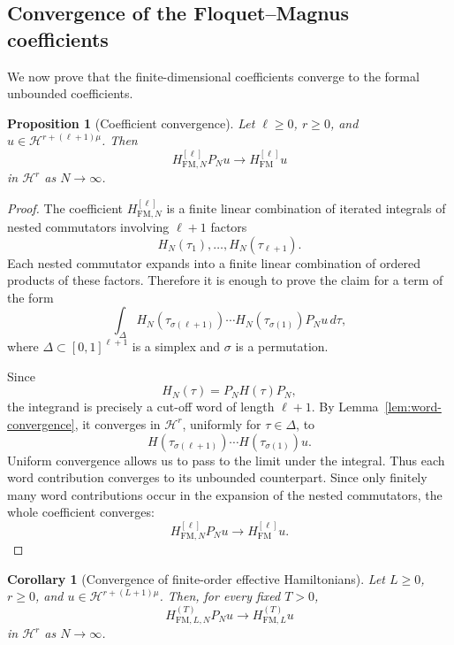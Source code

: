 \documentclass[11pt]{amsart}
\theoremstyle{plain}
\newtheorem{proposition}[theorem]{Proposition}
\newtheorem{corollary}[theorem]{Corollary}
\theoremstyle{definition}
\theoremstyle{remark}
\newcommand{\Hilb}{\mathcal H}
\begin{document}
\subsection{Convergence of the Floquet--Magnus coefficients}

We now prove that the finite-dimensional coefficients converge to the
formal unbounded coefficients.

\begin{proposition}[Coefficient convergence]
\label{prop:FM-coefficient-convergence}
Let \(\ell\geq0\), \(r\geq0\), and
\(u\in\Hilb^{r+(\ell+1)\mu}\).  Then
\[
        H_{\mathrm{FM},N}^{[\ell]}P_Nu
        \longrightarrow
        H_{\mathrm{FM}}^{[\ell]}u
\]
in \(\Hilb^r\) as \(N\to\infty\).
\end{proposition}

\begin{proof}
The coefficient \(H_{\mathrm{FM},N}^{[\ell]}\) is a finite linear
combination of iterated integrals of nested commutators involving
\(\ell+1\) factors
\[
        H_N(\tau_1),\ldots,H_N(\tau_{\ell+1}).
\]
Each nested commutator expands into a finite linear combination of
ordered products of these factors.  Therefore it is enough to prove the
claim for a term of the form
\[
        \int_{\Delta}
        H_N(\tau_{\sigma(\ell+1)})
        \cdots
        H_N(\tau_{\sigma(1)})
        P_Nu
        \,d\tau,
\]
where \(\Delta\subset[0,1]^{\ell+1}\) is a simplex and
\(\sigma\) is a permutation.

Since
\[
        H_N(\tau)=P_NH(\tau)P_N,
\]
the integrand is precisely a cut-off word of length \(\ell+1\).  By
Lemma~\ref{lem:word-convergence}, it converges in \(\Hilb^r\),
uniformly for \(\tau\in\Delta\), to
\[
        H(\tau_{\sigma(\ell+1)})
        \cdots
        H(\tau_{\sigma(1)})u.
\]
Uniform convergence allows us to pass to the limit under the integral.
Thus each word contribution converges to its unbounded counterpart.
Since only finitely many word contributions occur in the expansion of
the nested commutators, the whole coefficient converges:
\[
        H_{\mathrm{FM},N}^{[\ell]}P_Nu
        \longrightarrow
        H_{\mathrm{FM}}^{[\ell]}u.
\]
\end{proof}

\begin{corollary}[Convergence of finite-order effective Hamiltonians]
\label{cor:effective-H-convergence}
Let \(L\geq0\), \(r\geq0\), and
\(u\in\Hilb^{r+(L+1)\mu}\).  Then, for every fixed \(T>0\),
\[
        H_{\mathrm{FM},L,N}^{(T)}P_Nu
        \longrightarrow
        H_{\mathrm{FM},L}^{(T)}u
\]
in \(\Hilb^r\) as \(N\to\infty\).
\end{corollary}
\end{document}
